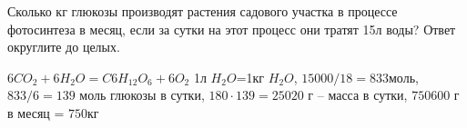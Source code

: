 
Сколько кг глюкозы производят растения садового участка в процессе фотосинтеза в месяц, если за сутки на этот процесс они тратят 15л воды? Ответ округлите до целых.

\solutionSection

$6CO_2+6H_2O=C6H_{12}O_6+6O_2$ 1л $H_2O$=1кг $H_2O$, 
$15000/18=833$моль, \linebreak $833/6=139$ моль глюкозы в сутки, $180 \cdot 139 = 25020$ г – масса в сутки, 
$750600$ г в месяц = $750$кг

